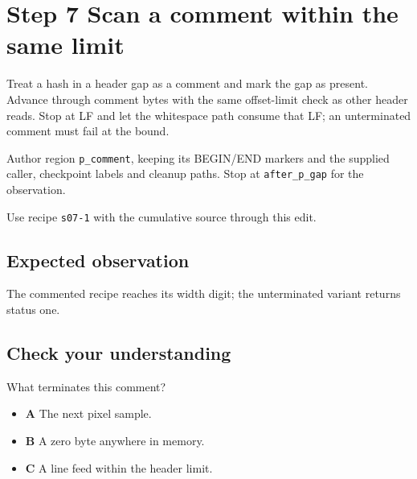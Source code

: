 \section{Step 7 Scan a comment within the same limit}\label{ppm-s07}

Treat a hash in a header gap as a comment and mark the gap as present. Advance through comment bytes with the same offset-limit check as other header reads. Stop at LF and let the whitespace path consume that LF; an unterminated comment must fail at the bound.

Author region \texttt{p\_comment}, keeping its BEGIN/END markers and the supplied caller, checkpoint labels and cleanup paths. Stop at \texttt{after\_p\_gap} for the observation.

Use recipe \texttt{s07-1} with the cumulative source through this edit.

\subsection{Expected observation}
The commented recipe reaches its width digit; the unterminated variant returns status one.

\subsection{Check your understanding}
What terminates this comment?

\begin{itemize}
\item \textbf{A} The next pixel sample.
\item \textbf{B} A zero byte anywhere in memory.
\item \textbf{C} A line feed within the header limit.
\end{itemize}
